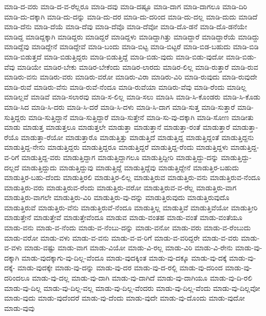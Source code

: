 {ಮಾಡಿ-ದ-ವರು
ಮಾಡಿ-ದ-ವ-ರೆಲ್ಲರೂ
ಮಾಡಿ-ದವು
ಮಾಡಿ-ದಷ್ಟೂ
ಮಾಡಿ-ದಾಗ
ಮಾಡಿ-ದಾಗಲೂ
ಮಾಡಿ-ದಿರಿ
ಮಾಡಿ-ದು-ದಕ್ಕಾಗಿ
ಮಾಡಿ-ದು-ದನ್ನು
ಮಾಡಿ-ದು-ದರ
ಮಾಡಿ-ದು-ದರಿಂದ
ಮಾಡಿ-ದು-ದಲ್ಲ
ಮಾಡಿ-ದುದು
ಮಾಡಿದೆ
ಮಾಡಿ-ದೆನು
ಮಾಡಿ-ದೆಯೆ
ಮಾಡಿ-ದೆವು
ಮಾಡಿ-ದೆವೊ
ಮಾಡಿ-ದೆವೋ
ಮಾಡಿ-ದೊ-ಡನೆ
ಮಾಡಿ-ದೊ-ಡನೆಯೇ
ಮಾಡಿದ್ದ
ಮಾಡಿದ್ದಕ್ಕಾಗಿ
ಮಾಡಿದ್ದರು
ಮಾಡಿದ್ದರೆ
ಮಾಡಿದ್ದಳು
ಮಾಡಿದ್ದಾಗಿತ್ತು
ಮಾಡಿದ್ದಾರೆ
ಮಾಡಿದ್ದಾರೆಯೆ
ಮಾಡಿದ್ದು
ಮಾಡಿದ್ದೆವು
ಮಾಡಿದ್ದೇನೆ
ಮಾಡಿದ್ದೇವೆ
ಮಾಡಿ-ಬಂದು
ಮಾಡಿ-ಬಿಟ್ಟ
ಮಾಡಿ-ಬಿಟ್ಟರೆ
ಮಾಡಿ-ಬಿಡ-ಬಹುದು
ಮಾಡಿ-ಬಿಡಿ
ಮಾಡಿ-ಬಿಡುತ್ತದೆ
ಮಾಡಿ-ಬಿಡುತ್ತಿದ್ದರು
ಮಾಡಿ-ಬಿಡುತ್ತಿದ್ದೆ
ಮಾಡಿ-ಬಿಡು-ವುದು
ಮಾಡಿ-ಬಿಡು-ವುದೋ
ಮಾಡಿ-ಬಿಡು-ವೆವು
ಮಾಡಿಯೇ
ಮಾಡಿರ-ಬೇಕು
ಮಾಡಿರ-ಬೇಕೆಂದು
ಮಾಡಿರ-ಲಾರದು
ಮಾಡಿರ-ಲಿಲ್ಲ
ಮಾಡಿ-ರುತ್ತಾರೆ
ಮಾಡಿ-ರುವ
ಮಾಡಿರು-ವನು
ಮಾಡಿರು-ವರು
ಮಾಡಿರು-ವರೋ
ಮಾಡಿರು-ವಿರಾ
ಮಾಡಿರು-ವಿರಿ
ಮಾಡಿ-ರುವುದು
ಮಾಡಿ-ರುವುದೇ
ಮಾಡಿ-ರುವೆ
ಮಾಡಿರು-ವೆನು
ಮಾಡಿ-ರುವೆ-ನೆಂದೂ
ಮಾಡಿ-ರುವೆಯಾ
ಮಾಡಿರು-ವೆವು
ಮಾಡಿ-ರೆಂದು
ಮಾಡಿಲ್ಲ
ಮಾಡಿಲ್ಲವೆ
ಮಾಡಿವೆ
ಮಾಡಿ-ಸಲಾರವು
ಮಾಡಿ-ಸ-ಲಿಲ್ಲ
ಮಾಡಿ-ಸಲು
ಮಾಡಿಸಿ
ಮಾಡಿ-ಸಿ-ಕೊಂಡರು
ಮಾಡಿ-ಸಿ-ಕೊಡು
ಮಾಡಿ-ಸಿದ
ಮಾಡಿ-ಸಿ-ದರು
ಮಾಡಿ-ಸಿ-ದರೆ
ಮಾಡಿ-ಸಿ-ದಳು
ಮಾಡಿ-ಸಿ-ದಾಗ
ಮಾಡಿ-ಸುತ್ತ
ಮಾಡಿ-ಸುತ್ತಾರೆ
ಮಾಡಿ-ಸುತ್ತಿದ್ದರು
ಮಾಡಿ-ಸುತ್ತಿದ್ದಾನೆ
ಮಾಡಿ-ಸುತ್ತಿದ್ದಾರೆ
ಮಾಡಿ-ಸುತ್ತೇನೆ
ಮಾಡಿ-ಸು-ವು-ದಕ್ಕಾಗಿ
ಮಾಡಿ-ಸೋಣ
ಮಾಡೀತು
ಮಾಡು
ಮಾಡುತ್ತ
ಮಾಡುತ್ತಲೂ
ಮಾಡುತ್ತಲೇ
ಮಾಡುತ್ತಾ
ಮಾಡುತ್ತಾನೆ
ಮಾಡುತ್ತಾ-ರಂತೆ
ಮಾಡುತ್ತಾರೆ
ಮಾಡುತ್ತಾ-ರೆಯೊ
ಮಾಡುತ್ತಾ-ರೆಯೋ
ಮಾಡುತ್ತಾರೊ
ಮಾಡುತ್ತಿತ್ತು
ಮಾಡುತ್ತಿದೆ
ಮಾಡುತ್ತಿದ್ದ
ಮಾಡುತ್ತಿದ್ದಂತೆ
ಮಾಡುತ್ತಿದ್ದನು
ಮಾಡುತ್ತಿದ್ದ-ನೇನು
ಮಾಡುತ್ತಿದ್ದರು
ಮಾಡುತ್ತಿದ್ದರೂ
ಮಾಡುತ್ತಿದ್ದರೆ
ಮಾಡುತ್ತಿದ್ದ-ರೆಂದು
ಮಾಡುತ್ತಿದ್ದಳು
ಮಾಡುತ್ತಿದ್ದ-ವ-ರಿಗೆ
ಮಾಡುತ್ತಿದ್ದ-ವರು
ಮಾಡುತ್ತಿದ್ದಾಗ
ಮಾಡುತ್ತಿದ್ದಾಗಲೂ
ಮಾಡುತ್ತಿದ್ದೀರಿ
ಮಾಡುತ್ತಿದ್ದು-ದನ್ನು
ಮಾಡುತ್ತಿದ್ದು-ದಲ್ಲದೆ
ಮಾಡುತ್ತಿದ್ದುದು
ಮಾಡುತ್ತಿದ್ದುವು
ಮಾಡುತ್ತಿದ್ದೆ
ಮಾಡುತ್ತಿದ್ದೆವು
ಮಾಡುತ್ತಿದ್ದೇನೆ
ಮಾಡುತ್ತಿರ-ಬಹುದು
ಮಾಡುತ್ತಿರ-ಬಹು-ದೆಂದು
ಮಾಡುತ್ತಿರಲಿ
ಮಾಡುತ್ತಿರ-ಲಿಲ್ಲ
ಮಾಡುತ್ತಿರುವ
ಮಾಡುತ್ತಿರು-ವನು
ಮಾಡುತ್ತಿರುವ-ನೆಂದೂ
ಮಾಡುತ್ತಿರು-ವರು
ಮಾಡುತ್ತಿರುವ-ರೆಂದು
ಮಾಡುತ್ತಿರು-ವರೋ
ಮಾಡುತ್ತಿರುವ-ವ-ರೆಲ್ಲ
ಮಾಡುತ್ತಿರು-ವಾಗ
ಮಾಡುತ್ತಿರು-ವಾಗಲೇ
ಮಾಡುತ್ತಿರು-ವಿರಿ
ಮಾಡುತ್ತಿರು-ವು-ದನ್ನು
ಮಾಡುತ್ತಿರುವುದು
ಮಾಡುತ್ತಿರುವುದೊ
ಮಾಡುತ್ತಿರುವೆ
ಮಾಡುತ್ತಿರು-ವೆನು
ಮಾಡುತ್ತಿರುವೆ-ನೆಂದೂ
ಮಾಡುತ್ತಿಲ್ಲ
ಮಾಡುತ್ತಿವೆ
ಮಾಡುತ್ತಿವೆಯೋ
ಮಾಡುತ್ತೀರಿ
ಮಾಡುತ್ತೇನೆ
ಮಾಡುತ್ತೇವೆ
ಮಾಡುತ್ತೇವೆಂದೂ
ಮಾಡುವ
ಮಾಡು-ವಂತಹ
ಮಾಡು-ವಂತೆ
ಮಾಡು-ವಂತೆಯೂ
ಮಾಡು-ವನು
ಮಾಡು-ವ-ನೆಂದು
ಮಾಡು-ವ-ನೆಂಬು-ದನ್ನು
ಮಾಡು-ವನೋ
ಮಾಡು-ವರು
ಮಾಡು-ವ-ರೆಂಬುದು
ಮಾಡು-ವರೋ
ಮಾಡು-ವಳು
ಮಾಡು-ವ-ವನು
ಮಾಡು-ವ-ವ-ರಿಗೆ
ಮಾಡು-ವ-ವರಿದ್ದರೇ
ಮಾಡು-ವ-ವರು
ಮಾಡು-ವ-ವಳು
ಮಾಡು-ವಷ್ಟು
ಮಾಡು-ವಾಗ
ಮಾಡು-ವಿಯೋ
ಮಾಡು-ವಿ-ರಲ್ಲ
ಮಾಡು-ವಿರಿ
ಮಾಡು-ವಿ-ರೇನು
ಮಾಡು-ವು-ದಕ್ಕಾಗಿ
ಮಾಡು-ವುದಕ್ಕಾಗು-ವು-ದಿಲ್ಲ-ವೆಂದೂ
ಮಾಡು-ವುದಕ್ಕಿಂತ
ಮಾಡು-ವು-ದಕ್ಕೂ
ಮಾಡು-ವು-ದಕ್ಕೆ
ಮಾಡು-ವು-ದಕ್ಕೆ-
ಮಾಡು-ವುದಕ್ಕೇ
ಮಾಡು-ವು-ದನ್ನು
ಮಾಡು-ವು-ದರ
ಮಾಡು-ವು-ದ-ರಲ್ಲಿ
ಮಾಡು-ವು-ದರಿಂದ
ಮಾಡು-ವು-ದರಿಂದಲೂ
ಮಾಡು-ವು-ದಲ್ಲ
ಮಾಡು-ವು-ದಾಗಿ
ಮಾಡು-ವು-ದಾಗಿದೆ
ಮಾಡು-ವು-ದಾಗಿಯೂ
ಮಾಡು-ವು-ದಿ-ರಲಿ
ಮಾಡು-ವು-ದಿಲ್ಲ
ಮಾಡು-ವು-ದಿಲ್ಲ-ವಲ್ಲ
ಮಾಡು-ವು-ದಿಲ್ಲ-ವೆಂದರು
ಮಾಡು-ವು-ದಿಲ್ಲ-ವೆಂದು
ಮಾಡು-ವು-ದಿಲ್ಲವೋ
ಮಾಡು-ವುದು
ಮಾಡು-ವುದೆಂದರೆ
ಮಾಡು-ವು-ದೆಂದು
ಮಾಡು-ವುದೇ
ಮಾಡು-ವು-ದೊಂದು
ಮಾಡು-ವುದೋ
ಮಾಡು-ವುವು
}
